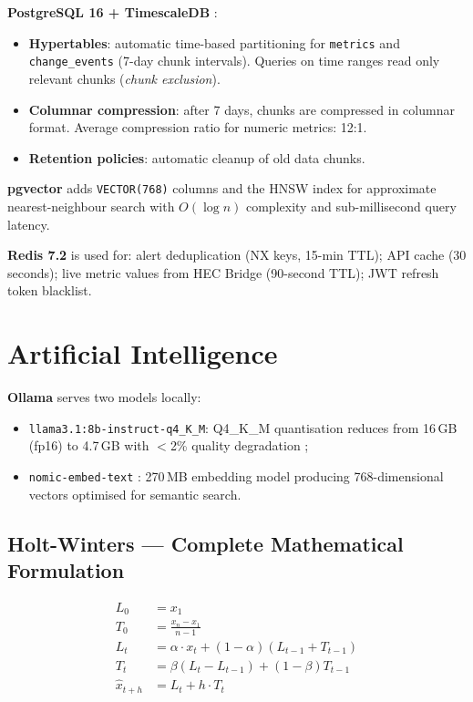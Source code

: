 \textbf{PostgreSQL 16 + TimescaleDB} \cite{postgresql16_doc, timescaledb2017}:
\begin{itemize}
  \item \textbf{Hypertables}: automatic time-based partitioning for \texttt{metrics}
    and \texttt{change\_events} (7-day chunk intervals). Queries on time ranges
    read only relevant chunks (\textit{chunk exclusion}).
  \item \textbf{Columnar compression}: after 7 days, chunks are compressed in
    columnar format. Average compression ratio for numeric metrics: 12:1.
  \item \textbf{Retention policies}: automatic cleanup of old data chunks.
\end{itemize}

\textbf{pgvector} \cite{pgvector2021} adds \texttt{VECTOR(768)} columns and the
HNSW index for approximate nearest-neighbour search with $O(\log n)$ complexity
and sub-millisecond query latency.

\textbf{Redis 7.2} is used for: alert deduplication (NX keys, 15-min TTL); API
cache (30 seconds); live metric values from HEC Bridge (90-second TTL); JWT
refresh token blacklist.

\section{Artificial Intelligence}

\textbf{Ollama} serves two models locally:
\begin{itemize}
  \item \texttt{llama3.1:8b-instruct-q4\_K\_M}: Q4\_K\_M quantisation reduces
    from 16\,GB (fp16) to 4.7\,GB with $<$2\% quality degradation
    \cite{dettmers2022quantization};
  \item \texttt{nomic-embed-text} \cite{nomicembed2024}: 270\,MB embedding model
    producing 768-dimensional vectors optimised for semantic search.
\end{itemize}

\subsection{Holt-Winters — Complete Mathematical Formulation}

\begin{align}
  L_0 &= x_1  \tag{level initialisation} \\
  T_0 &= \frac{x_n - x_1}{n-1} \tag{trend initialisation} \\
  L_t &= \alpha \cdot x_t + (1-\alpha)(L_{t-1} + T_{t-1}) \tag{level update} \\
  T_t &= \beta(L_t - L_{t-1}) + (1-\beta)T_{t-1} \tag{trend update} \\
  \hat{x}_{t+h} &= L_t + h \cdot T_t \tag{forecast at h steps ahead}
\end{align}

